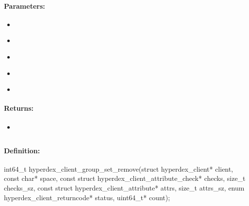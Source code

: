 \paragraph{Parameters:}
\begin{itemize}[noitemsep]
\item {}\\

\item {}\\

\item {}\\

\item {}\\

\item {}\\

\end{itemize}

\paragraph{Returns:}
\begin{itemize}[noitemsep]
\item {}\\

\end{itemize}

\pagebreak
\subsection{}
\label{api:c:group_set_remove}


\paragraph{Definition:}
\begin{ccode}
int64_t hyperdex_client_group_set_remove(struct hyperdex_client* client,
        const char* space,
        const struct hyperdex_client_attribute_check* checks, size_t checks_sz,
        const struct hyperdex_client_attribute* attrs, size_t attrs_sz,
        enum hyperdex_client_returncode* status,
        uint64_t* count);
\end{ccode}


